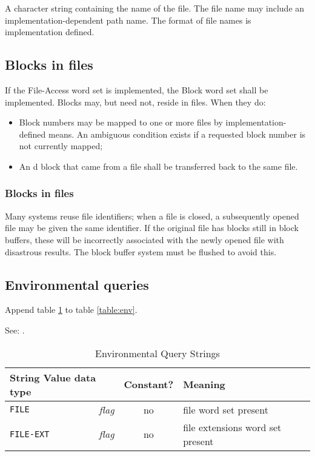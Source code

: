 A character string containing the name of the file. The file name
may include an implementation-dependent path name. The format of
file names is implementation defined.

\subsection{Blocks in files} %
\label{file:blocks}

If the File-Access word set is implemented, the Block word set
shall be implemented. Blocks may, but need not, reside in files.
When they do:
\begin{itemize}
\item Block numbers may be mapped to one or more files by
	implementation-defined means. An ambiguous condition exists
	if a requested block number is not currently mapped;
\item An d block that came from a file shall
	be transferred back to the same file.
\end{itemize}

\begin{info}
\subsubsection{Blocks in files}

Many systems reuse file identifiers; when a file is closed, a
subsequently opened file may be given the same identifier. If the
original file has blocks still in block buffers, these will be
incorrectly associated with the newly opened file with disastrous
results. The block buffer system must be flushed to avoid this.
\end{info}


\subsection{Environmental queries} %

Append table \ref{file:env} to table \ref{table:env}.

See: .

\begin{table}[ht]
  \begin{center}
	\caption{Environmental Query Strings}
	\label{file:env}
	\begin{tabular}{p{9em}rcp{}}
		\hline\hline
		\multicolumn{2}{l}{String \hfill Value data type} & Constant? & Meaning \\
		\hline
		\texttt{FILE}		& \emph{flag}		& no	&
			file word set present \\
		\texttt{FILE-EXT}	& \emph{flag}		& no	&
			file extensions word set present \\
		\hline\hline
	\end{tabular}
  \end{center}
\end{table}


